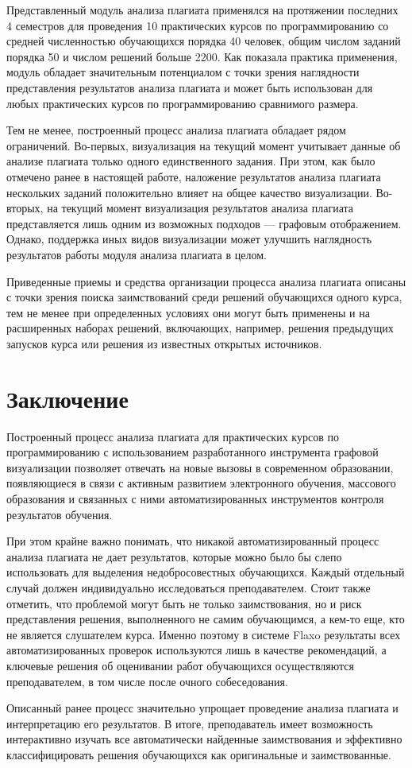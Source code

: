\documentclass[a4paper,14pt]{extarticle}
\begin{document}
Представленный модуль анализа плагиата применялся на протяжении последних 4 семестров для проведения 10 практических курсов по программированию со средней численностью обучающихся порядка 40 человек, общим числом заданий порядка 50 и числом решений больше 2200. Как показала практика применения, модуль обладает значительным потенциалом с точки зрения наглядности представления результатов анализа плагиата и может быть использован для любых практических курсов по программированию сравнимого размера.

Тем не менее, построенный процесс анализа плагиата обладает рядом ограничений. Во-первых, визуализация на текущий момент учитывает данные об анализе плагиата только одного единственного задания. При этом, как было отмечено ранее в настоящей работе, наложение результатов анализа плагиата нескольких заданий положительно влияет на общее качество визуализации. Во-вторых, на текущий момент визуализация результатов анализа плагиата представляется лишь одним из возможных подходов --- графовым отображением. Однако, поддержка иных видов визуализации может улучшить наглядность результатов работы модуля анализа плагиата в целом.

Приведенные приемы и средства организации процесса анализа плагиата описаны с точки зрения поиска заимствований среди решений обучающихся одного курса, тем не менее при определенных условиях они могут быть применены и на расширенных наборах решений, включающих, например, решения предыдущих запусков курса или решения из известных открытых источников.

\section{Заключение}

Построенный процесс анализа плагиата для практических курсов по программированию с использованием разработанного инструмента графовой визуализации позволяет отвечать на новые вызовы в современном образовании, появляющиеся в связи с активным развитием электронного обучения, массового образования и связанных с ними автоматизированных инструментов контроля результатов обучения.

При этом крайне важно понимать, что никакой автоматизированный процесс анализа плагиата не дает результатов, которые можно было бы слепо использовать для выделения недобросовестных обучающихся. Каждый отдельный случай должен индивидуально исследоваться преподавателем. Стоит также отметить, что проблемой могут быть не только заимствования, но и риск представления решения, выполненного не самим обучающимся, а кем-то еще, кто не является слушателем курса. Именно поэтому в системе Flaxo результаты всех автоматизированных проверок используются лишь в качестве рекомендаций, а ключевые решения об оценивании работ обучающихся осуществляются преподавателем, в том числе после очного собеседования.

Описанный ранее процесс значительно упрощает проведение анализа плагиата и интерпретацию его результатов. В итоге, преподаватель имеет возможность интерактивно изучать все автоматически найденные заимствования и эффективно классифицировать решения обучающихся как оригинальные и заимствованные.



\end{document}
